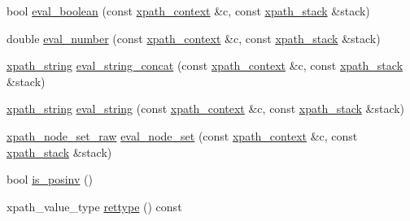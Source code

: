 \begin{DoxyCompactItemize}
\item 
bool \hyperlink{classxpath__ast__node_ab7f965a92023bc2704b8e6fd9f3d7c14}{eval\_\-boolean} (const \hyperlink{structxpath__context}{xpath\_\-context} \&c, const \hyperlink{structxpath__stack}{xpath\_\-stack} \&stack)
\item 
double \hyperlink{classxpath__ast__node_a92dd7048e28d486bc7f382d1fc6f1de6}{eval\_\-number} (const \hyperlink{structxpath__context}{xpath\_\-context} \&c, const \hyperlink{structxpath__stack}{xpath\_\-stack} \&stack)
\item 
\hyperlink{classxpath__string}{xpath\_\-string} \hyperlink{classxpath__ast__node_aaf931a091af0fb91c25e90b205363b4e}{eval\_\-string\_\-concat} (const \hyperlink{structxpath__context}{xpath\_\-context} \&c, const \hyperlink{structxpath__stack}{xpath\_\-stack} \&stack)
\item 
\hyperlink{classxpath__string}{xpath\_\-string} \hyperlink{classxpath__ast__node_a6b675237a590548b68d0e0b97518b6df}{eval\_\-string} (const \hyperlink{structxpath__context}{xpath\_\-context} \&c, const \hyperlink{structxpath__stack}{xpath\_\-stack} \&stack)
\item 
\hyperlink{classxpath__node__set__raw}{xpath\_\-node\_\-set\_\-raw} \hyperlink{classxpath__ast__node_a30d98ec97e3129e82ac9ec3f2a759855}{eval\_\-node\_\-set} (const \hyperlink{structxpath__context}{xpath\_\-context} \&c, const \hyperlink{structxpath__stack}{xpath\_\-stack} \&stack)
\item 
bool \hyperlink{classxpath__ast__node_a9253f88832441a357ea65639c73a34be}{is\_\-posinv} ()
\item 
xpath\_\-value\_\-type \hyperlink{classxpath__ast__node_a2c3598521141ed4b763fe6c4f852234f}{rettype} () const 
\end{DoxyCompactItemize}
